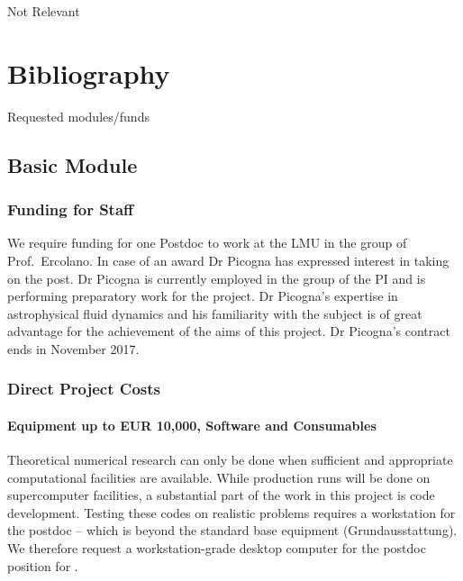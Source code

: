 \documentclass[10pt,fleqn,twoside]{article}
\begin{document}
Not Relevant

\section{Bibliography}

\begingroup
\renewcommand{\section}[2]{}%


\endgroup


\section{Requested modules/funds}
\renewcommand{\leftmark}{\sc  Requested modules/funds}

\subsection{Basic Module}

\subsubsection{Funding for Staff}

We require funding for one Postdoc to work at the LMU in the group of
Prof.\ Ercolano. In case of an award Dr Picogna has expressed interest
in taking on the post. Dr Picogna is currently employed in the group of the
PI and is performing preparatory work for the project. Dr Picogna's
expertise in astrophysical fluid dynamics and his familiarity with the
subject is of great advantage for the achievement of the aims of this
project. Dr Picogna's contract ends in November 2017.

\subsubsection{Direct Project Costs}


\paragraph{Equipment up to EUR 10,000, Software and Consumables}

Theoretical numerical research can only be done when sufficient and
appropriate computational facilities are available. While production
runs will be done on supercomputer facilities, a substantial part of
the work in this project is code development. Testing these codes on
realistic problems requires a workstation for the postdoc -- which is
beyond the standard base equipment 
(Grundausstattung). We therefore request a workstation-grade desktop
computer for the postdoc position for .
\end{document}
